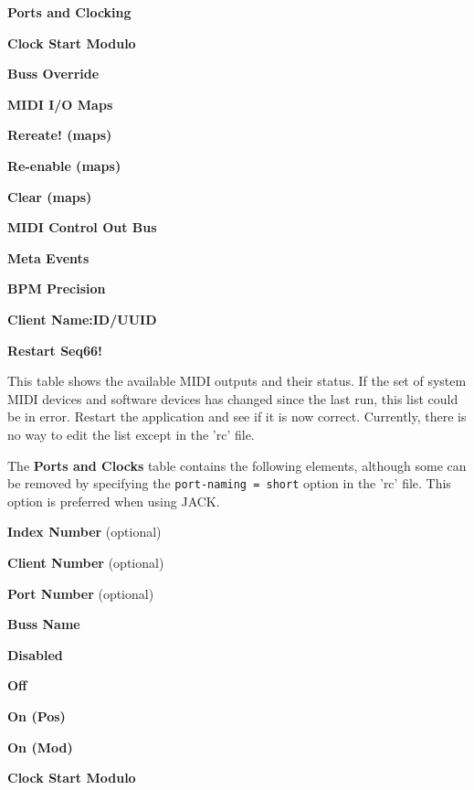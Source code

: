    \begin{enumber}
      \item \textbf{Ports and Clocking}
      \item \textbf{Clock Start Modulo}
      \item \textbf{Buss Override}
      \item \textbf{MIDI I/O Maps}
      \item \textbf{Rereate! (maps)}
      \item \textbf{Re-enable (maps)}
      \item \textbf{Clear (maps)}
      \item \textbf{MIDI Control Out Bus}
      \item \textbf{Meta Events}
      \item \textbf{BPM Precision}
      \item \textbf{Client Name:ID/UUID}
      \item \textbf{Restart Seq66!}
   \end{enumber}

   \setcounter{ItemCounter}{0}      %


   This table shows the available MIDI outputs and their status.
   If the set of system MIDI devices and software devices has changed since
   the last run, this list could be in error.  Restart the application
   and see if it is now correct.  Currently, there is no way to edit the list
   except in the 'rc' file.

   The \textbf{Ports and Clocks} table contains the following elements,
   although some can be removed by specifying the
   \texttt{port-naming = short} option in the 'rc' file.
   This option is preferred when using JACK.

   \begin{enumber}
      \item \textbf{Index Number} (optional)
      \item \textbf{Client Number} (optional)
      \item \textbf{Port Number} (optional)
      \item \textbf{Buss Name}
      \item \textbf{Disabled}
      \item \textbf{Off}
      \item \textbf{On (Pos)}
      \item \textbf{On (Mod)}
      \item \textbf{Clock Start Modulo}
   \end{enumber}

